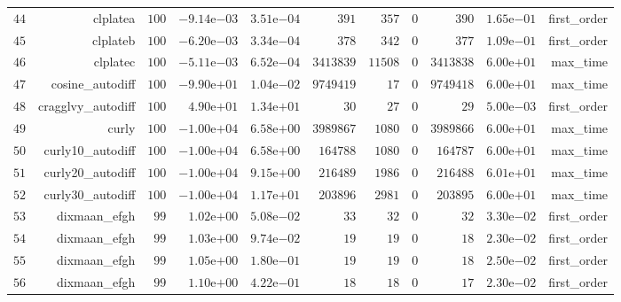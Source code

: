 \documentclass[varwidth=20cm,crop=true]{standalone}
\begin{document}
\begin{longtable}{rrrrrrrrrrr}
  \(    44\) & clplatea & \(   100\) & \(-9.14\)e\(-03\) & \( 3.51\)e\(-04\) & \(   391\) & \(   357\) & \(     0\) & \(   390\) & \( 1.65\)e\(-01\) & first\_order \\
  \(    45\) & clplateb & \(   100\) & \(-6.20\)e\(-03\) & \( 3.34\)e\(-04\) & \(   378\) & \(   342\) & \(     0\) & \(   377\) & \( 1.09\)e\(-01\) & first\_order \\
  \(    46\) & clplatec & \(   100\) & \(-5.11\)e\(-03\) & \( 6.52\)e\(-04\) & \(3413839\) & \( 11508\) & \(     0\) & \(3413838\) & \( 6.00\)e\(+01\) & max\_time \\
  \(    47\) & cosine\_autodiff & \(   100\) & \(-9.90\)e\(+01\) & \( 1.04\)e\(-02\) & \(9749419\) & \(    17\) & \(     0\) & \(9749418\) & \( 6.00\)e\(+01\) & max\_time \\
  \(    48\) & cragglvy\_autodiff & \(   100\) & \( 4.90\)e\(+01\) & \( 1.34\)e\(+01\) & \(    30\) & \(    27\) & \(     0\) & \(    29\) & \( 5.00\)e\(-03\) & first\_order \\
  \(    49\) & curly & \(   100\) & \(-1.00\)e\(+04\) & \( 6.58\)e\(+00\) & \(3989867\) & \(  1080\) & \(     0\) & \(3989866\) & \( 6.00\)e\(+01\) & max\_time \\
  \(    50\) & curly10\_autodiff & \(   100\) & \(-1.00\)e\(+04\) & \( 6.58\)e\(+00\) & \(164788\) & \(  1080\) & \(     0\) & \(164787\) & \( 6.00\)e\(+01\) & max\_time \\
  \(    51\) & curly20\_autodiff & \(   100\) & \(-1.00\)e\(+04\) & \( 9.15\)e\(+00\) & \(216489\) & \(  1986\) & \(     0\) & \(216488\) & \( 6.01\)e\(+01\) & max\_time \\
  \(    52\) & curly30\_autodiff & \(   100\) & \(-1.00\)e\(+04\) & \( 1.17\)e\(+01\) & \(203896\) & \(  2981\) & \(     0\) & \(203895\) & \( 6.00\)e\(+01\) & max\_time \\
  \(    53\) & dixmaan\_efgh & \(    99\) & \( 1.02\)e\(+00\) & \( 5.08\)e\(-02\) & \(    33\) & \(    32\) & \(     0\) & \(    32\) & \( 3.30\)e\(-02\) & first\_order \\
  \(    54\) & dixmaan\_efgh & \(    99\) & \( 1.03\)e\(+00\) & \( 9.74\)e\(-02\) & \(    19\) & \(    19\) & \(     0\) & \(    18\) & \( 2.30\)e\(-02\) & first\_order \\
  \(    55\) & dixmaan\_efgh & \(    99\) & \( 1.05\)e\(+00\) & \( 1.80\)e\(-01\) & \(    19\) & \(    19\) & \(     0\) & \(    18\) & \( 2.50\)e\(-02\) & first\_order \\
  \(    56\) & dixmaan\_efgh & \(    99\) & \( 1.10\)e\(+00\) & \( 4.22\)e\(-01\) & \(    18\) & \(    18\) & \(     0\) & \(    17\) & \( 2.30\)e\(-02\) & first\_order \\

\end{longtable}
\end{document}
